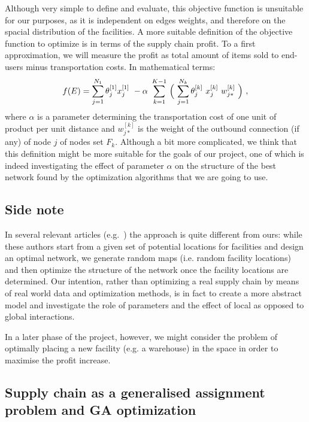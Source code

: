 \documentclass[12pt,titlepage]{article}
\begin{document}
Although very simple to define and evaluate, this objective function is unsuitable for our purposes, as it is independent on edges weights, and therefore on the spacial distribution of the facilities. A more suitable definition of the objective function to optimize is in terms of the supply chain profit. To a first approximation, we will measure the profit as total amount of items sold to end-users minus transportation costs. 
In mathematical terms:
\begin{equation}
f(E) = \sum_{j=1}^{N_1} \theta_j^{[1]} x_j^{[1]} \ - \alpha \ \sum_{k=1}^{K-1} \ \Bigl( \ \sum_{j=1}^{N_k} \theta_j^{[k]} \ x_j^{[k]} \ w_{j*}^{[k]} \ \Bigr) \ ,
\label{eq:fitness}
\end{equation} 
where $\alpha$ is a parameter determining the transportation cost of one unit of product per unit distance and $w_{j*}^{[k]}$ is the weight of the outbound connection (if any) of node $j$ of nodes set $F_k$. Although a bit more complicated, we think that this definition might be more suitable for the goals of our project, one of which is indeed investigating the effect of parameter $\alpha$ on the structure of the best network found by the optimization algorithms that we are going to use.

\subsection*{Side note}
In several relevant articles (e.g.~\cite{altiparmak2006genetic, amiri2006designing, syarif2002study}) the approach is quite different from ours: while these authors start from a given set of potential locations for facilities and design an optimal network, we generate random maps (i.e. random facility locations) and then optimize the structure of the network once the facility locations are determined. Our intention, rather than optimizing a real supply chain by means of real world data and optimization methods, is in fact to create a more abstract model and investigate the role of parameters and the effect of local as opposed to global interactions.

In a later phase of the project, however, we might consider the problem of optimally placing a new facility (e.g. a warehouse) in the space in order to maximise the profit increase.

\subsection*{Supply chain as a generalised assignment problem and GA optimization}
\end{document}
